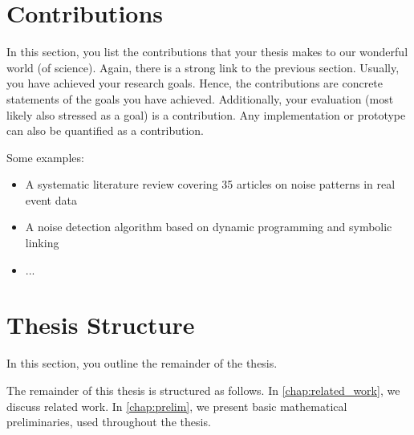 {\section{Contributions}

In this section, you list the contributions that your thesis makes to our wonderful world (of science).
Again, there is a strong link to the previous section.
Usually, you have achieved your research goals.
Hence, the contributions are concrete statements of the goals you have achieved.
Additionally, your evaluation (most likely also stressed as a goal) is a contribution.
Any implementation or prototype can also be quantified as a contribution.

Some examples:
\begin{itemize}
	\item A systematic literature review covering 35 articles on noise patterns in real event data
	\item A noise detection algorithm based on dynamic programming and symbolic linking
	\item ...
\end{itemize}

\section{Thesis Structure}
In this section, you outline the remainder of the thesis.

The remainder of this thesis is structured as follows.
In \cref{chap:related_work}, we discuss related work.
In \cref{chap:prelim}, we present basic mathematical preliminaries, used throughout the thesis.

}\fi

